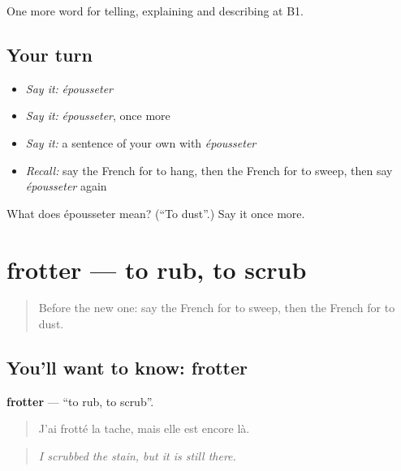 \begin{grammarlens}[title={What you've built}]
One more word for telling, explaining and describing at B1.
\end{grammarlens}

\subsection*{Your turn}
\begin{itemize}
\raggedright
  \item \emph{Say it:} \emph{épousseter}
  \item \emph{Say it:} \emph{épousseter}, once more
  \item \emph{Say it:} a sentence of your own with \emph{épousseter}
  \item \emph{Recall:} say the French for to hang, then the French for to sweep, then say \emph{épousseter} again
\end{itemize}

\begin{tcolorbox}[breakable,colback=teal!4,colframe=teal!35!black,title={Before you move on}]
What does épousseter mean? (\textquotedblleft{}To dust\textquotedblright{}.) Say it once more.
\end{tcolorbox}
\section[frotter]{frotter — to rub, to scrub}

\label{lesson:FR-C528-frotter}



\begin{quote}
Before the new one: say the French for to sweep, then the French for to dust.
\end{quote}

\subsection*{You'll want to know: frotter}
\textbf{frotter} — \textquotedblleft{}to rub, to scrub\textquotedblright{}.

\begin{quote}
J'ai frotté la tache, mais elle est encore là.
\end{quote}

\begin{quote}
\emph{I scrubbed the stain, but it is still there.}
\end{quote}


